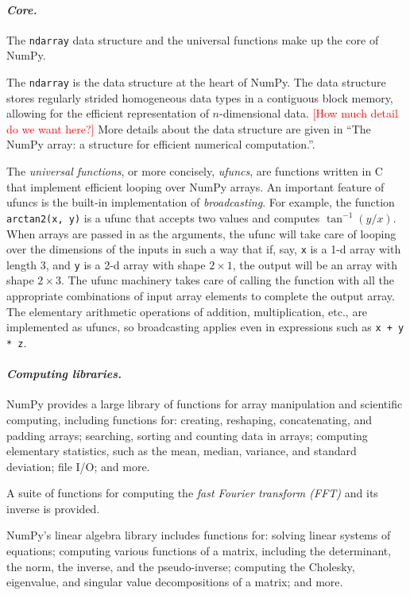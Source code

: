 \documentclass[fleqn,10pt]{wlscirep}
\newcommand{\code}[1]{\texttt{#1}}
\newcommand{\fixme}[1]{\textcolor{red}{{#1}}}
\begin{document}
\paragraph{\emph{Core.}}  The \code{ndarray} data structure and the
universal functions make up the core of NumPy.

The \code{ndarray} is the data structure at the heart of NumPy.
The data structure stores regularly strided homogeneous data types
in a contiguous block memory, allowing for the efficient representation
of $n$-dimensional data. \fixme{[How much detail do we want here?]}
More details about the data structure are given in ``The NumPy array:
a structure for efficient numerical computation.''\cite{vanderwalt2011numpy}.

The \emph{universal functions}, or more concisely, \emph{ufuncs},
are functions written in C that implement efficient looping over
NumPy arrays. An important feature of ufuncs is the built-in
implementation of \emph{broadcasting}.  For example, the function
\code{arctan2(x, y)} is a ufunc that accepts two values and computes
$\tan^{-1}(y/x)$.  When arrays are passed in as the arguments,
the ufunc will take care of looping over the dimensions of the inputs
in such a way that if, say, \code{x} is a 1-d array with length 3, and
\code{y} is a 2-d array with shape $2 \times 1$, the output will be
an array with shape $2 \times 3$.  The ufunc machinery takes care
of calling the function with all the appropriate combinations of
input array elements to complete the output array.
The elementary arithmetic operations of addition, multiplication, etc.,
are implemented as ufuncs, so broadcasting applies even in expressions
such as \code{x + y * z}.

\paragraph{\emph{Computing libraries.}}
NumPy provides a large library of functions for array manipulation
and scientific computing, including functions for: creating, reshaping,
concatenating, and padding arrays; searching, sorting and counting data
in arrays; computing elementary statistics, such as the mean, median,
variance, and standard deviation; file I/O; and more.

A suite of functions for computing the \emph{fast Fourier transform (FFT)}
and its inverse is provided.

NumPy's linear algebra library includes functions for: solving linear
systems of equations; computing various functions of a matrix, including
the determinant, the norm, the inverse, and the pseudo-inverse;
computing the Cholesky, eigenvalue, and singular value decompositions of a matrix;
and more.
\end{document}
